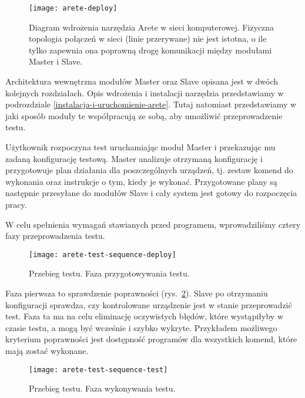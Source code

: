 \documentclass[00-praca-magisterska.tex]{subfiles}
\begin{document}
\begin{figure}
\begin{center}
\leavevmode
\texttt{[image: arete-deploy]}
\end{center}
\caption{Diagram wdrożenia narzędzia Arete w sieci komputerowej. Fizyczna
topologia połączeń w sieci (linie przerywane) nie jest istotna, o ile tylko
zapewnia ona poprawną drogę komunikacji między modułami Master i Slave.}
\label{fig:arete-deploy}
\end{figure}

Architektura wewnętrzna modułów Master oraz Slave opisana jest w dwóch
kolejnych rozdziałach. Opis wdrożenia i instalacji narzędzia przedstawiamy w
podrozdziale \ref{instalacja-i-uruchomienie-arete}. Tutaj natomiast przedstawiamy w jaki
sposób moduły te współpracują ze sobą, aby umożliwić przeprowadzenie testu.

Użytkownik rozpoczyna test uruchamiając moduł Master i przekazując mu zadaną
konfigurację testową. Master analizuje otrzymaną konfigurację i przygotowuje
plan działania dla poszczególnych urządzeń, tj. zestaw komend do wykonania oraz
instrukcje o tym, kiedy je wykonać. Przygotowane plany są następnie przesyłane
do modułów Slave i cały system jest gotowy do rozpoczęcia pracy.

W celu spełnienia wymagań stawianych przed programem, wprowadziliśmy cztery
fazy przeprowadzenia testu.

\begin{figure}
\begin{center}
\leavevmode
\texttt{[image: arete-test-sequence-deploy]}
\end{center}
\caption{Przebieg testu. Faza przygotowywania testu.}
\label{fig:arete-test-seq-deploy}
\end{figure}

Faza pierwsza to sprawdzenie poprawności (rys.~\ref{fig:arete-test-seq-deploy}).
Slave po otrzymaniu konfiguracji sprawdza, czy kontrolowane urządzenie jest w
stanie przeprowadzić test. Faza ta ma na celu eliminację oczywistych błędów,
które wystąpiłyby w czasie testu, a mogą być wcześnie i szybko wykryte.
Przykładem możliwego kryterium poprawności jest dostępność programów dla
wszystkich komend, które mają zostać wykonane.

\begin{figure}
\begin{center}
\leavevmode
\texttt{[image: arete-test-sequence-test]}
\end{center}
\caption{Przebieg testu. Faza wykonywania testu.}
\label{fig:arete-test-seq-test}
\end{figure}
\end{document}
